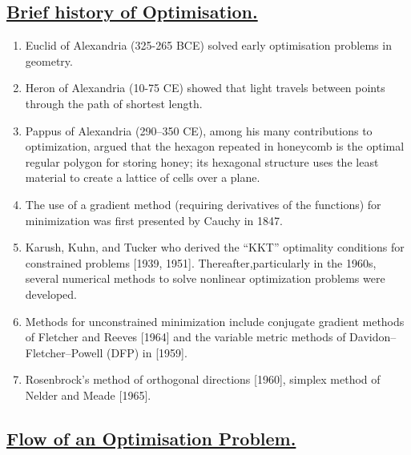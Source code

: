 \documentclass[12pt,a4paper,titlepage]{article}
\begin{document}
\subsection{\underline{Brief history of Optimisation.}}
\begin{enumerate}
    \item Euclid of Alexandria (325-265 BCE) solved early optimisation problems in geometry.
    \item Heron of Alexandria (10-75 CE) showed that light travels between points through the path of shortest length.
    \item Pappus of Alexandria (290–350 CE), among his many contributions to optimization, argued that the hexagon repeated in honeycomb is the optimal regular polygon for storing honey; its hexagonal structure uses the least material to create a lattice of cells over a plane.
    \item The use of a gradient method (requiring derivatives of the functions) for minimization was first presented by Cauchy in 1847. 
    \item Karush, Kuhn, and Tucker who derived the “KKT” optimality conditions for constrained problems [1939, 1951]. Thereafter,particularly in the 1960s, several numerical methods to solve nonlinear optimization problems were developed.
    \item Methods for unconstrained minimization include conjugate gradient methods of Fletcher and Reeves [1964] and the variable metric methods of Davidon–Fletcher–Powell (DFP) in [1959].
    \item  Rosenbrock's method of orthogonal directions [1960], simplex method of Nelder and Meade [1965]. 
    \end{enumerate}
    
%
\subsection{\underline{Flow of an Optimisation Problem.}}
\end{document}
